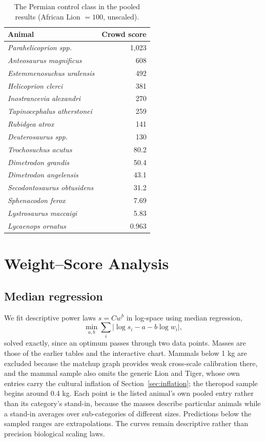 \documentclass[11pt]{article}
\begin{document}
\begin{table}[H]
\centering
\small
\begin{tabular}{lr}
\toprule
Animal & Crowd score \\
\midrule
\textit{Parahelicoprion spp.} & 1,023 \\
\textit{Anteosaurus magnificus} & 608 \\
\textit{Estemmenosuchus uralensis} & 492 \\
\textit{Helicoprion clerci} & 381 \\
\textit{Inostrancevia alexandri} & 270 \\
\textit{Tapinocephalus atherstonei} & 259 \\
\textit{Rubidgea atrox} & 141 \\
\textit{Deuterosaurus spp.} & 130 \\
\textit{Trochosuchus acutus} & 80.2 \\
\textit{Dimetrodon grandis} & 50.4 \\
\textit{Dimetrodon angelensis} & 43.1 \\
\textit{Secodontosaurus obtusidens} & 31.2 \\
\textit{Sphenacodon ferox} & 7.69 \\
\textit{Lystrosaurus maccaigi} & 5.83 \\
\textit{Lycaenops ornatus} & 0.963 \\
\bottomrule
\end{tabular}
\caption{The Permian control class in the pooled results (African Lion $=100$, unscaled).}
\label{tab:permian}
\end{table}

\section{Weight--Score Analysis}
\label{sec:weight}

\subsection{Median regression}
We fit descriptive power laws $s=Cw^b$ in log-space using median regression,
\[
\min_{a,b}\sum_i |\log s_i-a-b\log w_i|,
\]
solved exactly, since an optimum passes through two data points. Masses are those of the earlier tables and the interactive chart. Mammals below 1 kg are excluded because the matchup graph provides weak cross-scale calibration there, and the mammal sample also omits the generic Lion and Tiger, whose own entries carry the cultural inflation of Section~\ref{sec:inflation}; the theropod sample begins around 0.4 kg. Each point is the listed animal's own pooled entry rather than its category's stand-in, because the masses describe particular animals while a stand-in averages over sub-categories of different sizes. Predictions below the sampled ranges are extrapolations. The curves remain descriptive rather than precision biological scaling laws.
\end{document}
